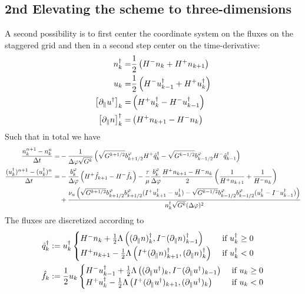 \subsection{2nd Elevating the scheme to three-dimensions}
A second possibility is to first center the coordinate system on the fluxes on the staggered grid and then
in a second step center on the time-derivative:
\begin{align}
n_k^\dagger =& \frac{1}{2}\left( H^- n_k + H^+ n_{k+1}\right) \\
u_k =& \frac{1}{2}\left( H^- u^\dagger_{k-1} + H^+ u_{k}^\dagger\right)\\
\left[\partial_\parallel u^\dagger \right]_k =& \left( H^+ u^\dagger_{k} - H^-
u^\dagger_{k-1}\right) \\
\left[\partial_\parallel n\right]^\dagger_k =& \left( H^+ n_{k+1} - H^-
n_k\right)
\end{align}
Such that in total we have
\begin{align}
    \frac{n_k^{n+1} - n_k^n}{\Delta t} = &-\frac{1}{\Delta\varphi \sqrt{G^k}}
    \left( \sqrt{G^{k+1/2}}b^\varphi_{k+1/2}  H^+ \hat q_{k}^\dagger
    -\sqrt{G^{k-1/2}}b^\varphi_{k-1/2}  H^- \hat q_{k-1}^\dagger \right)
     \\
    \frac{(u_k^\dagger)^{n+1}-(u_k^\dagger)^{n}}{\Delta t} = &-
 \frac{b^\varphi_k}{\Delta\varphi}\left( H^+\hat f_{k+1} - H^-\hat f_k\right)
 -\frac{\tau}{\mu}\frac{b^\varphi_k}{\Delta\varphi} \frac{H^+ n_{k+1} - H^- n_k}{2}\left( \frac{1}{H^+ n_{k+1}} + \frac{1}{H^- n_k} \right)
    \nonumber\\
    &+ \frac{\nu_u
        \left(\sqrt{G^{k+1/2}}b^\varphi_{k+1/2}b^\varphi_{k+1/2} (I^+ u^\dagger_{k+1} - u^\dagger_k)
        - \sqrt{G^{k-1/2}}b^\varphi_{k-1/2}b^\varphi_{k-1/2} ( u^\dagger_k - I^- u^\dagger_{k-1})\right)
    }{n^\dagger_{k} \sqrt{G^k}(\Delta \varphi)^2}
\end{align}
The fluxes are discretized according to
\begin{align}
    \hat q^\dagger_k &:= u^\dagger_k \begin{cases}
        H^- n_k     + \frac{1}{2}\Lambda\left( (\partial_\parallel n)^\dagger_k, I^- (\partial_\parallel n)^\dagger_{k-1}\right)&\text{ if } u^\dagger_k \geq 0 \\
        H^+ n_{k+1} - \frac{1}{2}\Lambda\left( I^+(\partial_\parallel n)^\dagger_{k+1}, (\partial_\parallel n)^\dagger_k\right) &\text{ if } u^\dagger_k < 0
    \end{cases}
    \\
    \hat f_k &:= \frac{1}{2}u_k\begin{cases}
        H^- u^\dagger_{k-1} + \frac{1}{2}\Lambda\left( (\partial_\parallel u^\dagger )_k, I^- (\partial_\parallel u^\dagger)_{k-1}\right)&\text{ if } u_k \geq 0 \\
        H^+ u^\dagger_{k}   - \frac{1}{2}\Lambda\left( I^+(\partial_\parallel u^\dagger)_{k+1}, (\partial_\parallel u^\dagger)_k\right) &\text{ if } u_k < 0 \\
    \end{cases}
\end{align}




